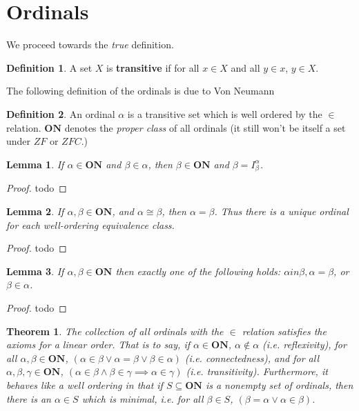 \documentclass{article}
\theoremstyle{definition}
\newtheorem{definition}{Definition}[section]
\theoremstyle{plain}
\theoremstyle{theorem}
\newtheorem{lemma}{Lemma}[section]
\newtheorem{theorem}{Theorem}[section]
\begin{document}
\section{Ordinals}
We proceed towards the \textit{true} definition.
\begin{definition}
	A set $X$ is \textbf{transitive} if for all $x \in X$ and all $y \in x$, $y \in X$. 
\end{definition}
The following definition of the ordinals is due to Von Neumann
\begin{definition}
	An ordinal $\alpha$ is a transitive set which is well ordered by the $\in$ relation. $\bm{ON}$ denotes the \textit{proper class} of all ordinals (it still won't be itself a set under $ZF$ or $ZFC$.)  
\end{definition}
\begin{lemma}
	If $\alpha \in \bm{ON}$ and $\beta \in \alpha$, then $\beta \in \bm{ON}$ and $\beta = I_{\beta}^{\alpha}$. 
\end{lemma}
\begin{proof}
	todo
\end{proof}
\begin{lemma}
	If $\alpha,\beta \in \bm{ON}$, and $\alpha \cong \beta$, then $\alpha = \beta$. Thus there is a unique ordinal for each well-ordering equivalence class.
\end{lemma}
\begin{proof}
todo
\end{proof}
\begin{lemma}
	If $\alpha,\beta \in \bm{ON}$ then exactly one of the following holds: $\alpha in \beta, \alpha = \beta$, or $\beta \in \alpha$. 
\end{lemma}
\begin{proof}
todo
\end{proof}
\begin{theorem}
	The collection of all ordinals with the $\in$ relation satisfies the axioms for a linear order. That is to say, if $\alpha \in \bm{ON}$, $\alpha \notin \alpha$ (i.e. reflexivity), for all $\alpha,\beta \in \bm{ON}$, $(\alpha \in \beta \vee \alpha = \beta \vee \beta \in \alpha)$ (i.e. connectedness), and for all $\alpha,\beta,\gamma \in \bm{ON}$, $(\alpha \in \beta \wedge \beta \in \gamma \implies \alpha \in \gamma)$ (i.e. transitivity). Furthermore, it behaves like a well ordering in that if $S \subseteq \bm{ON}$ is a nonempty set of ordinals, then there is an $\alpha \in S$ which is minimal, i.e. for all $\beta \in S$, $(\beta = \alpha \vee \alpha \in \beta)$. 
\end{theorem}
\end{document}
